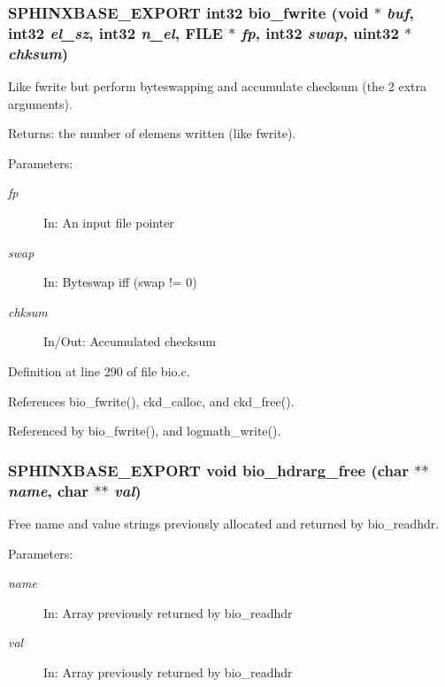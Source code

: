 \subsubsection[{bio\_\-fwrite}]{\setlength{\rightskip}{0pt plus 5cm}SPHINXBASE\_\-EXPORT int32 bio\_\-fwrite (void $\ast$ {\em buf}, \/  int32 {\em el\_\-sz}, \/  int32 {\em n\_\-el}, \/  FILE $\ast$ {\em fp}, \/  int32 {\em swap}, \/  uint32 $\ast$ {\em chksum})}\label{bio_8h_3b131beb20492e1a6f46c9b4dd81a64e}


Like fwrite but perform byteswapping and accumulate checksum (the 2 extra arguments). 

\begin{Desc}
\item[Returns:]the number of elemens written (like fwrite). \end{Desc}
\begin{Desc}
\item[Parameters: ]\par
\begin{description}
\item[{\em 
fp}]In: An input file pointer \item[{\em 
swap}]In: Byteswap iff (swap != 0) \item[{\em 
chksum}]In/Out: Accumulated checksum \end{description}
\end{Desc}


Definition at line 290 of file bio.c.

References bio\_\-fwrite(), ckd\_\-calloc, and ckd\_\-free().

Referenced by bio\_\-fwrite(), and logmath\_\-write().
\subsubsection[{bio\_\-hdrarg\_\-free}]{\setlength{\rightskip}{0pt plus 5cm}SPHINXBASE\_\-EXPORT void bio\_\-hdrarg\_\-free (char $\ast$$\ast$ {\em name}, \/  char $\ast$$\ast$ {\em val})}\label{bio_8h_db3c858a50381aeff022ccd4271af2d9}


Free name and value strings previously allocated and returned by bio\_\-readhdr. 

\begin{Desc}
\item[Parameters: ]\par
\begin{description}
\item[{\em 
name}]In: Array previously returned by bio\_\-readhdr \item[{\em 
val}]In: Array previously returned by bio\_\-readhdr \end{description}
\end{Desc}


